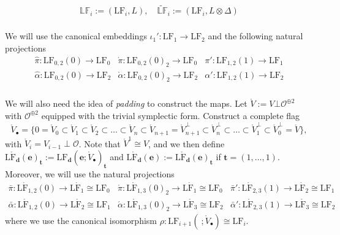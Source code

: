 \documentclass[a4paper]{amsart}
\theoremstyle{plain}
\theoremstyle{definition}
\numberwithin{equation}{section}
\newcommand{\SO}{\mathcal{O}}
\newcommand{\LF}{\mathrm{LF}}
\newcommand{\LFo}{\mathrm{L}\mathring{\mathrm{F}}}
\begin{document}
$$\mathbb{LF}_i := (\LF_i, L), \quad \widetilde{\mathbb{LF}}_i := (\LF_i, L \otimes \Delta)  $$

\subsubsection{} We will use the canonical embeddings $ \iota_1': \LF_1 \to \LF_2 $ and the following natural projections
\[\begin{array}{lll}
        \hat{\pi}:\mathrm{LF}_{0,2}(0) \to \LF_0       & \grave{\pi}:\mathrm{LF}_{0,2}(0)_2 \to \LF_0       & \pi':\mathrm{LF}_{1,2}(1) \to \LF_1       \\
        \hat{\alpha}: \mathrm{LF}_{0,2}(0) \to \LF_{2} & \grave{\alpha}: \mathrm{LF}_{0,2}(0)_2 \to \LF_{2} & \alpha': \mathrm{LF}_{1,2}(1) \to \LF_{2}
    \end{array}\]
\subsubsection{}\label{sect:padding}    We will also need the idea of \textit{padding} to construct the maps. Let $\mathring{V}:= V \bot \SO^{\oplus 2}$ with $\SO^{\oplus 2}$ equipped with the trivial symplectic form. Construct a complete flag
\[
    \mathring{V}_{\bullet} = \{0=\mathring{V}_{0} \subset \mathring{V}_{1} \subset \mathring{V}_{2} \subset \ldots \subset \mathring{V}_{n} \subset \mathring{V}_{n+1} = \mathring{V}_{n+1}^{\bot} \subset \mathring{V}_{n}^{\bot} \subset \ldots \subset \mathring{V}_{1}^{\bot} \subset \mathring{V}_{0}^{\bot} = \mathring{V}\},
\]
with $\mathring{V}_i = V_{i-1} \perp \SO $. Note that $\mathring{V}^{1} \cong V$, and we then define
$       \mathrm{L}\mathring{\mathrm{F}}_{\mathbf{d}}(\mathbf{e})_{\mathbf{t}}:= \mathrm{L}{\mathrm{F}}_{\mathbf{d}}(\mathbf{e};\mathring{V}_\bullet)_{\mathbf{t}}$ and $
    \mathrm{L}\mathring{\mathrm{F}}_{\mathbf{d}}(\mathbf{e}):= \mathrm{L}\mathring{\mathrm{F}}_{\mathbf{d}}(\mathbf{e})_{\mathbf{t}}$ if $\mathbf{t} = (1, \ldots, 1)$. Moreover, we will use the natural projections
\[\begin{array}{lll}
        \bar{\pi}:\mathrm{L}\mathring{\mathrm{F}}_{1,2}(0) \to \LFo_1 \cong \LF_0      & \acute{\pi}:\mathrm{L}\mathring{\mathrm{F}}_{1,3}(0)_2 \to \LFo_1 \cong \LF_0       & \bar{\pi}':\LFo_{2,3}(1) \to \LFo_2\cong \LF_1       \\
        \bar{\alpha}:\mathrm{L}\mathring{\mathrm{F}}_{1,2}(0) \to \LFo_{2} \cong \LF_1 & \acute{\alpha}: \mathrm{L}\mathring{\mathrm{F}}_{1,3}(0)_2 \to \LFo_{3} \cong \LF_2 & \bar{\alpha}': \LFo_{2,3}(1) \to \LFo_3\cong \LF_{2}
    \end{array}\]
where we use the canonical isomorphism $\rho: \mathrm{LF}_{i+1}(~;\mathring{V}_\bullet) \cong \LF_{i}$.
\end{document}
